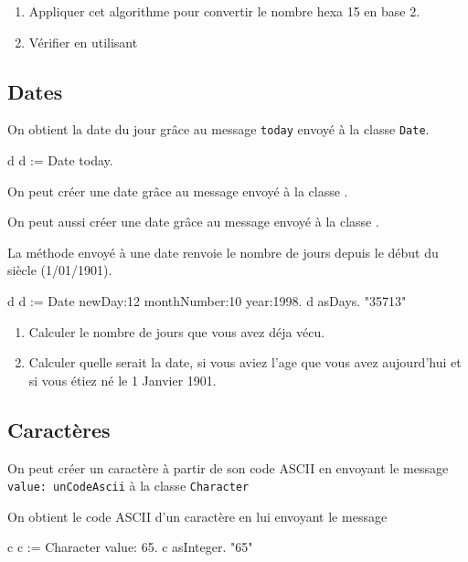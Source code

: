 \begin{enumerate}
\item Appliquer cet algorithme pour convertir le nombre hexa 15 en base 2.
\item V\'erifier en utilisant 
\end{enumerate}
 
\subsection{Dates}

On obtient la date du jour gr\^ace au message \verb|today| envoy\'e
\`a la classe \verb|Date|.
\begin{scode}
\stBar d \stBar
d := Date today.
\end{scode}

On peut cr\'eer une date gr\^ace au message  envoy\'e \`a la classe .

On peut aussi cr\'eer une date gr\^ace au message  envoy\'e \`a la classe .

La m\'ethode  envoy\'e \`a une date renvoie le nombre de jours depuis le d\'ebut du si\`ecle (1/01/1901).

\begin{scode}
\stBar d \stBar
d := Date newDay:12 monthNumber:10 year:1998.
d asDays. "35713"
\end{scode}

\begin{enumerate}
\item Calculer le nombre de jours que vous avez d\'eja v\'ecu.
\item Calculer quelle serait la date, si vous aviez l'age que vous avez aujourd'hui
et si vous \'etiez n\'e le 1 Janvier 1901.
\end{enumerate}

\subsection{Caract\`eres}

On peut cr\'eer un caract\`ere \`a partir de son code ASCII en envoyant
le message \verb|value: unCodeAscii| \`a la classe \verb|Character|

On obtient le code ASCII d'un caract\`ere en lui envoyant le message

\begin{scode}
\stBar c \stBar
c := Character value: 65.
c asInteger. "65"
\end{scode}
 
